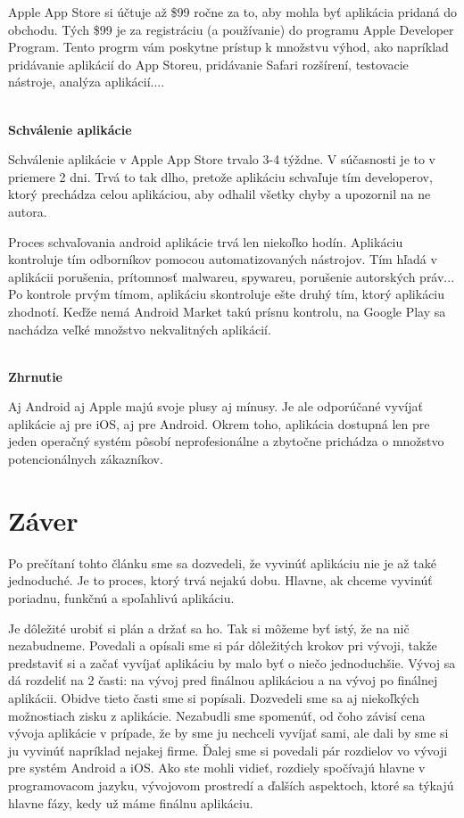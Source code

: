 \documentclass[10pt,twoside,slovak,a4paper]{article}
\begin{document}
Apple App Store si účtuje až \$99 ročne za to, aby mohla byť aplikácia pridaná do obchodu. Tých \$99 je za registráciu (a používanie) do programu Apple Developer Program. Tento progrm vám poskytne prístup k množstvu výhod, ako napríklad pridávanie aplikácií do App Storeu, pridávanie Safari rozšírení, testovacie nástroje, analýza aplikácií....
\cite{CWC}

\cite{eYewated3, eliteml}
\\	%


\textbf{Schválenie aplikácie}

Schválenie aplikácie v Apple App Store trvalo 3-4 týždne. V súčasnosti je to v priemere 2 dni. Trvá to tak dlho, pretože aplikáciu schvaľuje tím developerov, ktorý prechádza celou aplikáciou, aby odhalil všetky chyby a upozornil na ne autora.

Proces schvaľovania android aplikácie trvá len niekoľko hodín. Aplikáciu kontroluje tím odborníkov pomocou automatizovaných nástrojov. Tím hľadá v aplikácii porušenia, prítomnosť malwareu, spywareu, porušenie autorských práv... Po kontrole prvým tímom, aplikáciu skontroluje ešte druhý tím, ktorý aplikáciu zhodnotí. Keďže nemá Android Market takú prísnu kontrolu, na Google Play sa nachádza veľké množstvo nekvalitných aplikácií.

\cite{eYew3, DZone}
\\	%


\textbf{Zhrnutie}

Aj Android aj Apple majú svoje plusy aj mínusy. Je ale odporúčané vyvíjať aplikácie aj pre iOS, aj pre Android. Okrem toho, aplikácia dostupná len pre jeden operačný systém pôsobí neprofesionálne a zbytočne prichádza o množstvo potencionálnych zákazníkov.



\section{Záver} \label{zaver} %
\quad Po prečítaní tohto článku sme sa dozvedeli, že vyvinúť aplikáciu nie je až také jednoduché. Je to proces, ktorý trvá nejakú dobu. Hlavne, ak chceme vyvinúť poriadnu, funkčnú a spoľahlivú aplikáciu.

Je dôležité urobiť si plán a držať sa ho. Tak si môžeme byť istý, že na nič nezabudneme. Povedali a opísali sme si pár dôležitých krokov pri vývoji, takže predstaviť si a začať vyvíjať aplikáciu by malo byť o niečo jednoduchšie. Vývoj sa dá rozdeliť na 2 časti: na vývoj pred finálnou aplikáciou a na vývoj po finálnej aplikácii. Obidve tieto časti sme si popísali. Dozvedeli sme sa aj niekoľkých možnostiach zisku z aplikácie. Nezabudli sme spomenúť, od čoho závisí cena vývoja aplikácie v prípade, že by sme ju nechceli vyvíjať sami, ale dali by sme si ju vyvinúť napríklad nejakej firme. Ďalej sme si povedali pár rozdielov vo vývoji pre systém Android a iOS. Ako ste mohli vidieť, rozdiely spočívajú hlavne  v programovacom jazyku, vývojovom prostredí a ďalších aspektoch, ktoré sa týkajú hlavne fázy, kedy už máme finálnu aplikáciu.
\end{document}
